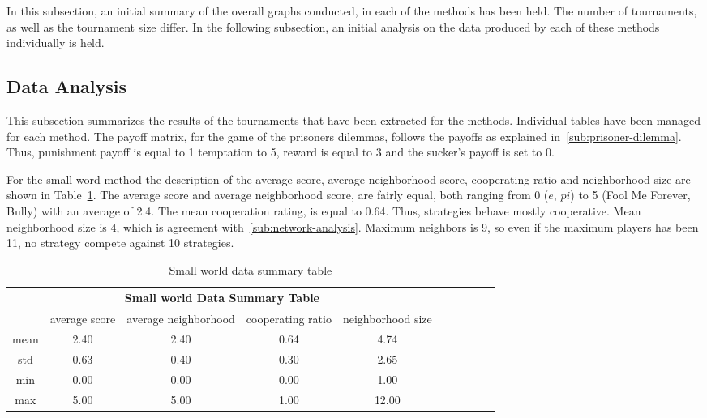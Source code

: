 In this subsection, an initial summary of the overall graphs conducted, in
each of the methods has been held. The number of tournaments, as well as the
tournament size differ. In the following subsection, an initial analysis on the
data produced by each of these methods individually is held.

\subsection{Data Analysis}
This subsection summarizes the results of the tournaments that have been extracted
for the methods.
Individual tables have been managed for each method. The payoff matrix, for
the game of the prisoners dilemmas, follows the payoffs as explained in~\autoref{sub:prisoner-dilemma}.
Thus, punishment payoff is equal to 1 temptation to 5, reward is equal to 3 and
the sucker's payoff is set to 0.

For the small word method the description of the average score, average
neighborhood score, cooperating ratio and neighborhood size are shown in
Table~\ref{table:summary-small-data}. The average score and average
neighborhood score, are fairly equal, both ranging from 0 ($e$, $pi$) to 5 (Fool Me Forever, Bully)
with an average of 2.4. The mean cooperation rating, is equal to 0.64. Thus, strategies behave mostly cooperative.
Mean neighborhood size is 4, which is agreement with~\autoref{sub:network-analysis}.
Maximum neighbors is 9, so even if the maximum players has been 11, no strategy
compete against 10 strategies.

\begin{table}[!hbtp]
	\centering
	\begin{adjustbox}{width=0.8\textwidth}
		\small
		\begin{tabular}{cccccccccc}
				\toprule
			\multicolumn{5}{|c|}{Small world Data Summary Table}                                \\ \hline
			     & average score & average neighborhood & cooperating ratio & neighborhood size \\ \hline
			mean & 2.40          & 2.40                 & 0.64              & 4.74              \\ \hline
			std  & 0.63          & 0.40                 & 0.30              & 2.65              \\ \hline
			min  & 0.00          & 0.00                 & 0.00              & 1.00              \\ \hline
			max  & 5.00          & 5.00                 & 1.00              & 12.00             \\ \bottomrule
		\end{tabular}
	\end{adjustbox}
	\caption{Small world data summary table}
	\label{table:summary-small-data}
\end{table}

